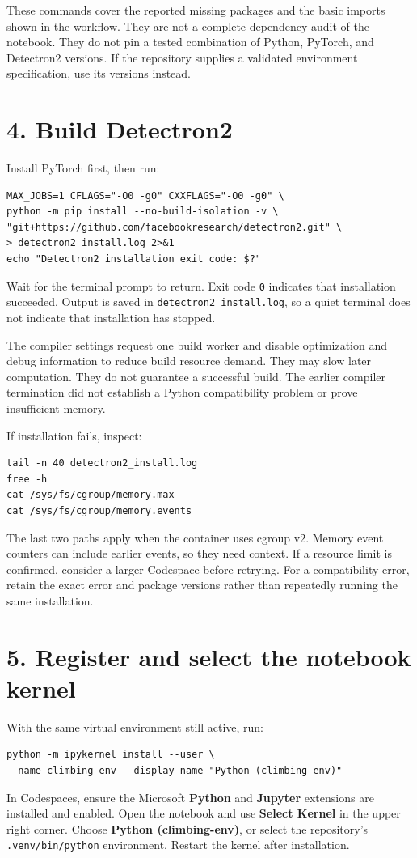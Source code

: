 \documentclass[10pt]{article}
\begin{document}
These commands cover the reported missing packages and the basic imports shown in the workflow. They are not a complete dependency audit of the notebook. They do not pin a tested combination of Python, PyTorch, and Detectron2 versions. If the repository supplies a validated environment specification, use its versions instead.

\newpage
\section*{4. Build Detectron2}
Install PyTorch first, then run:
\begin{lstlisting}
MAX_JOBS=1 CFLAGS="-O0 -g0" CXXFLAGS="-O0 -g0" \
python -m pip install --no-build-isolation -v \
"git+https://github.com/facebookresearch/detectron2.git" \
> detectron2_install.log 2>&1
echo "Detectron2 installation exit code: $?"
\end{lstlisting}
Wait for the terminal prompt to return. Exit code \texttt{0} indicates that installation succeeded. Output is saved in \texttt{detectron2\_install.log}, so a quiet terminal does not indicate that installation has stopped.

The compiler settings request one build worker and disable optimization and debug information to reduce build resource demand. They may slow later computation. They do not guarantee a successful build. The earlier compiler termination did not establish a Python compatibility problem or prove insufficient memory.

If installation fails, inspect:
\begin{lstlisting}
tail -n 40 detectron2_install.log
free -h
cat /sys/fs/cgroup/memory.max
cat /sys/fs/cgroup/memory.events
\end{lstlisting}
The last two paths apply when the container uses cgroup v2. Memory event counters can include earlier events, so they need context. If a resource limit is confirmed, consider a larger Codespace before retrying. For a compatibility error, retain the exact error and package versions rather than repeatedly running the same installation.

\section*{5. Register and select the notebook kernel}
With the same virtual environment still active, run:
\begin{lstlisting}
python -m ipykernel install --user \
--name climbing-env --display-name "Python (climbing-env)"
\end{lstlisting}
In Codespaces, ensure the Microsoft \textbf{Python} and \textbf{Jupyter} extensions are installed and enabled. Open the notebook and use \textbf{Select Kernel} in the upper right corner. Choose \textbf{Python (climbing-env)}, or select the repository's \texttt{.venv/bin/python} environment. Restart the kernel after installation.
\end{document}
